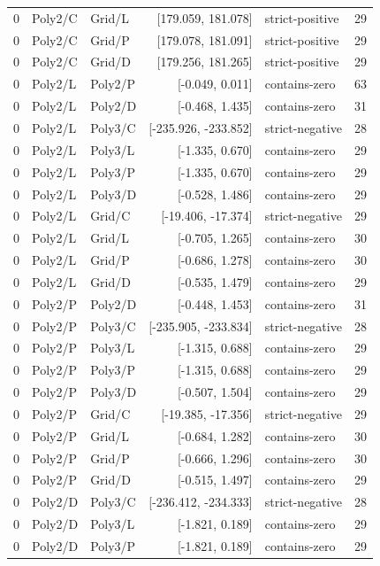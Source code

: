 \begin{longtable}{lllrlr}
0 & Poly2/C & Grid/L & [179.059, 181.078] & strict-positive & 29 \\
0 & Poly2/C & Grid/P & [179.078, 181.091] & strict-positive & 29 \\
0 & Poly2/C & Grid/D & [179.256, 181.265] & strict-positive & 29 \\
0 & Poly2/L & Poly2/P & [-0.049, 0.011] & contains-zero & 63 \\
0 & Poly2/L & Poly2/D & [-0.468, 1.435] & contains-zero & 31 \\
0 & Poly2/L & Poly3/C & [-235.926, -233.852] & strict-negative & 28 \\
0 & Poly2/L & Poly3/L & [-1.335, 0.670] & contains-zero & 29 \\
0 & Poly2/L & Poly3/P & [-1.335, 0.670] & contains-zero & 29 \\
0 & Poly2/L & Poly3/D & [-0.528, 1.486] & contains-zero & 29 \\
0 & Poly2/L & Grid/C & [-19.406, -17.374] & strict-negative & 29 \\
0 & Poly2/L & Grid/L & [-0.705, 1.265] & contains-zero & 30 \\
0 & Poly2/L & Grid/P & [-0.686, 1.278] & contains-zero & 30 \\
0 & Poly2/L & Grid/D & [-0.535, 1.479] & contains-zero & 29 \\
0 & Poly2/P & Poly2/D & [-0.448, 1.453] & contains-zero & 31 \\
0 & Poly2/P & Poly3/C & [-235.905, -233.834] & strict-negative & 28 \\
0 & Poly2/P & Poly3/L & [-1.315, 0.688] & contains-zero & 29 \\
0 & Poly2/P & Poly3/P & [-1.315, 0.688] & contains-zero & 29 \\
0 & Poly2/P & Poly3/D & [-0.507, 1.504] & contains-zero & 29 \\
0 & Poly2/P & Grid/C & [-19.385, -17.356] & strict-negative & 29 \\
0 & Poly2/P & Grid/L & [-0.684, 1.282] & contains-zero & 30 \\
0 & Poly2/P & Grid/P & [-0.666, 1.296] & contains-zero & 30 \\
0 & Poly2/P & Grid/D & [-0.515, 1.497] & contains-zero & 29 \\
0 & Poly2/D & Poly3/C & [-236.412, -234.333] & strict-negative & 28 \\
0 & Poly2/D & Poly3/L & [-1.821, 0.189] & contains-zero & 29 \\
0 & Poly2/D & Poly3/P & [-1.821, 0.189] & contains-zero & 29 \\

\end{longtable}
